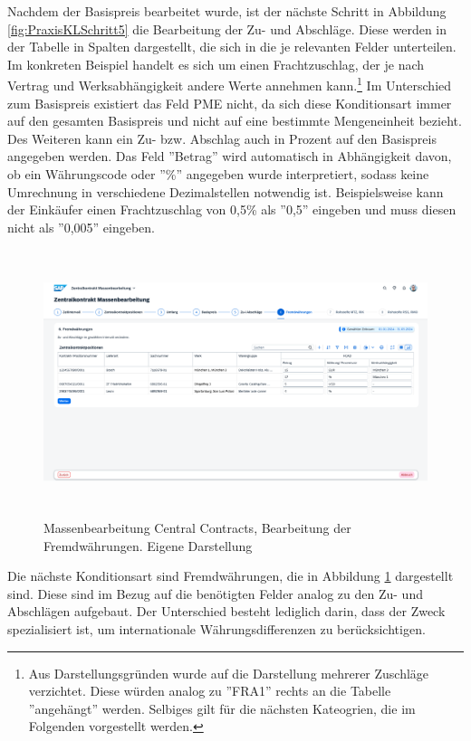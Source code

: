 Nachdem der Basispreis bearbeitet wurde, ist der nächste Schritt in Abbildung \ref{fig:PraxisKLSchritt5} die Bearbeitung der Zu- und Abschläge. Diese werden in der Tabelle in Spalten dargestellt, die sich in die je relevanten Felder unterteilen. Im konkreten Beispiel handelt es sich um einen Frachtzuschlag, der je nach Vertrag und Werksabhängigkeit andere Werte annehmen kann.\footnote{Aus Darstellungsgründen wurde auf die Darstellung mehrerer Zuschläge verzichtet. Diese würden analog zu ''FRA1'' rechts an die Tabelle ''angehängt'' werden. Selbiges gilt für die nächsten Kateogrien, die im Folgenden vorgestellt werden.} Im Unterschied zum Basispreis existiert das Feld PME nicht, da sich diese Konditionsart immer auf den gesamten Basispreis und nicht auf eine bestimmte Mengeneinheit bezieht. Des Weiteren kann ein Zu- bzw. Abschlag auch in Prozent auf den Basispreis angegeben werden. Das Feld ''Betrag'' wird automatisch in Abhängigkeit davon, ob ein Währungscode oder ''\%'' angegeben wurde interpretiert, sodass keine Umrechnung in verschiedene Dezimalstellen notwendig ist. Beispielsweise kann der Einkäufer einen Frachtzuschlag von 0,5\% als ''0,5'' eingeben und muss diesen nicht als ''0,005'' eingeben.

\begin{figure}[H]
    \centering
    \includegraphics[height=7.78cm]{Bilder/Praxisteil-KL-Schritt-6.png}
    \caption[Massenbearbeitung Central Contracts, Bearbeitung der Fremdwährungen]{Massenbearbeitung Central Contracts, Bearbeitung der Fremdwährungen. Eigene Darstellung}
    \label{fig:PraxisKLSchritt6}
\end{figure}

Die nächste Konditionsart sind Fremdwährungen, die in Abbildung \ref{fig:PraxisKLSchritt6} dargestellt sind. Diese sind im Bezug auf die benötigten Felder analog zu den Zu- und Abschlägen aufgebaut. Der Unterschied besteht lediglich darin, dass der Zweck spezialisiert ist, um internationale Währungsdifferenzen zu berücksichtigen.

